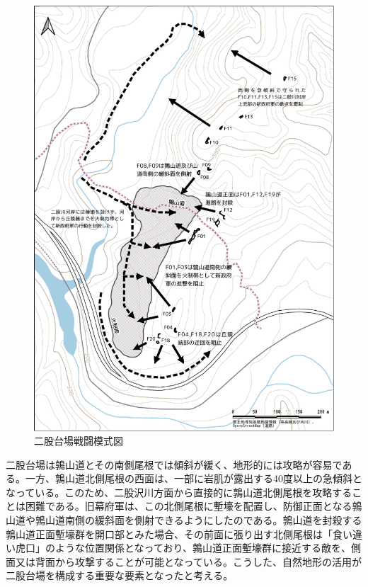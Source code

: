 \documentclass[11pt,report]{jsarticle}
\begin{document}
\begin{figure}[ht]
\centering
\includegraphics[width=160truemm]{../02fig/11battle_model.pdf}
\caption{二股台場戦闘模式図}
\label{battle}
\end{figure}

二股台場は鶉山道とその南側尾根では傾斜が緩く、地形的には攻略が容易である。一方、鶉山道北側尾根の西面は、一部に岩肌が露出する40度以上の急傾斜となっている。このため、二股沢川方面から直接的に鶉山道北側尾根を攻略することは困難である。旧幕府軍は、この北側尾根に塹壕を配置し、防御正面となる鶉山道や鶉山道南側の緩斜面を側射できるようにしたのである。鶉山道を封殺する鶉山道正面塹壕群を開口部とみた場合、その前面に張り出す北側尾根は「食い違い虎口」のような位置関係となっており、鶉山道正面塹壕群に接近する敵を、側面又は背面から攻撃することが可能となっている。こうした、自然地形の活用が二股台場を構成する重要な要素となったと考える。
\end{document}
